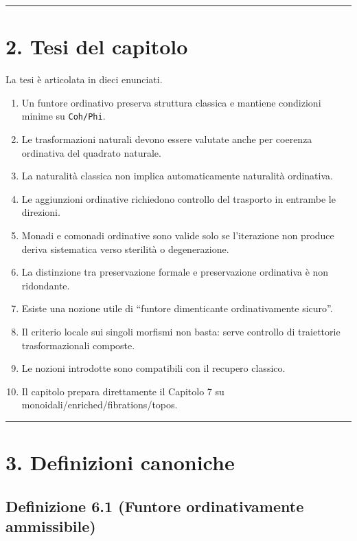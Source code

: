 \begin{center}\rule{0.5\linewidth}{0.5pt}\end{center}

\section{2. Tesi del capitolo}

La tesi è articolata in dieci enunciati.

\begin{enumerate}
\def\labelenumi{\arabic{enumi}.}
\tightlist
\item
  Un funtore ordinativo preserva struttura classica e mantiene condizioni minime su \texttt{Coh/Phi}.
\item
  Le trasformazioni naturali devono essere valutate anche per coerenza ordinativa del quadrato naturale.
\item
  La naturalità classica non implica automaticamente naturalità ordinativa.
\item
  Le aggiunzioni ordinative richiedono controllo del trasporto in entrambe le direzioni.
\item
  Monadi e comonadi ordinative sono valide solo se l'iterazione non produce deriva sistematica verso sterilità o degenerazione.
\item
  La distinzione tra preservazione formale e preservazione ordinativa è non ridondante.
\item
  Esiste una nozione utile di ``funtore dimenticante ordinativamente sicuro''.
\item
  Il criterio locale sui singoli morfismi non basta: serve controllo di traiettorie trasformazionali composte.
\item
  Le nozioni introdotte sono compatibili con il recupero classico.
\item
  Il capitolo prepara direttamente il Capitolo 7 su monoidali/enriched/fibrations/topos.
\end{enumerate}

\begin{center}\rule{0.5\linewidth}{0.5pt}\end{center}

\section{3. Definizioni canoniche}

\subsection{Definizione 6.1 (Funtore ordinativamente ammissibile)}

